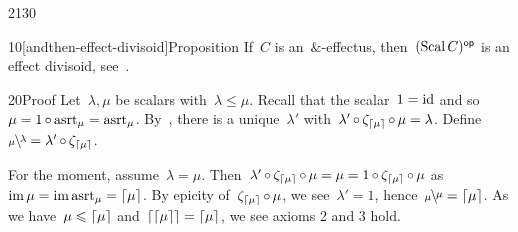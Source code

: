\begin{parsec}{2130}%
\begin{point}{10}[andthen-effect-divisoid]{Proposition}%
If~$C$ is an~$\&$-effectus,
    then~$(\operatorname{Scal} C)^{\mathsf{op}}$ is an effect divisoid,
    see~.
\begin{point}{20}{Proof}%
Let~$\lambda,\mu$ be scalars with~$\lambda \leq \mu$.
Recall that the scalar~$1=\mathrm{id}$
    and so~$\mu = 1 \mathop{\circ} \mathrm{asrt}_\mu = \mathrm{asrt}_\mu$.
By~,
    there is a unique~$\lambda'$
    with~$\lambda' \mathop{\circ} \zeta_{\left\lceil\mu\right\rceil} \mathop{\circ} \mu = \lambda$.
Define~$\rfrac{\lambda}{\mu} = \lambda'  \after \zeta_{\ceil{\mu}}$.

For the moment, assume~$\lambda = \mu$.
Then~$\lambda' \mathop{\circ} \zeta_{\left\lceil\mu\right\rceil} \mathop{\circ} \mu
            = \mu = 1 \mathop{\circ} \zeta_{\left\lceil\mu\right\rceil} \mathop{\circ} \mu$
            as~$\operatorname{im} \mu = \operatorname{im} \mathrm{asrt}_{\mu} = \left\lceil\mu\right\rceil$.
        By epicity of~$\zeta_{\left\lceil\mu\right\rceil} \mathop{\circ} \mu$,
            we see~$\lambda' = 1$, hence~$\rfrac{\mu}{\mu}=\ceil{\mu}$.
As we have~$\mu \leqslant \left\lceil\mu\right\rceil$ and~$\left\lceil\left\lceil\mu\right\rceil\right\rceil = \left\lceil\mu\right\rceil$,
    we see axioms 2 and 3 hold.


\end{point}
\end{point}
\end{parsec}
